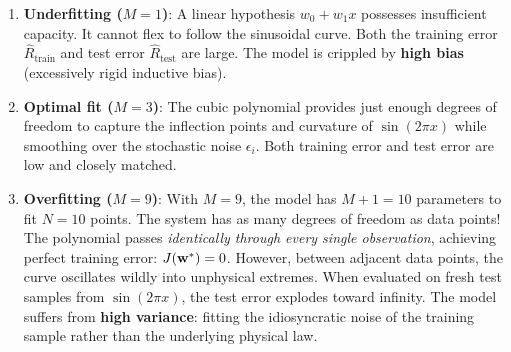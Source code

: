 \begin{enumerate}[leftmargin=*]
  \item \textbf{Underfitting ($M = 1$)}: A linear hypothesis $w_0 + w_1 x$ possesses insufficient capacity. It cannot flex to follow the sinusoidal curve. Both the training error $\hat{R}_{\text{train}}$ and test error $\hat{R}_{\text{test}}$ are large. The model is crippled by \textbf{high bias} (excessively rigid inductive bias).
  \item \textbf{Optimal fit ($M = 3$)}: The cubic polynomial provides just enough degrees of freedom to capture the inflection points and curvature of $\sin(2\pi x)$ while smoothing over the stochastic noise $\epsilon_i$. Both training error and test error are low and closely matched.
  \item \textbf{Overfitting ($M = 9$)}: With $M = 9$, the model has $M+1 = 10$ parameters to fit $N = 10$ points. The system has as many degrees of freedom as data points! The polynomial passes \textit{identically through every single observation}, achieving perfect training error: $J(\mathbf{w}^*) = 0$. However, between adjacent data points, the curve oscillates wildly into unphysical extremes. When evaluated on fresh test samples from $\sin(2\pi x)$, the test error explodes toward infinity. The model suffers from \textbf{high variance}: fitting the idiosyncratic noise of the training sample rather than the underlying physical law.
\end{enumerate}

